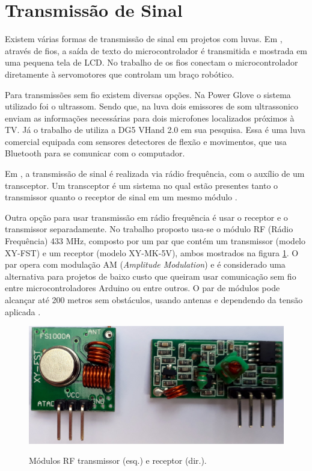 \documentclass[
	12pt,				%
	openright,			%
	oneside,			%
	a4paper,			%
	english,			%
	brazil				%
	]{abntex2}
\begin{document}
		\section{Transmissão de Sinal}
		
		Existem várias formas de transmissão de sinal em projetos com luvas. Em \cite{solanki2013sign}, através de fios, a saída de texto do microcontrolador é transmitida e mostrada em uma pequena tela de LCD. No trabalho de \cite{syed2012armcontroller} os fios conectam o microcontrolador diretamente à servomotores que controlam um braço robótico.

		Para transmissões sem fio existem diversas opções. Na Power Glove \cite{dana1989powerglove} o sistema utilizado foi o ultrassom. Sendo que, na luva dois emissores de som ultrassonico enviam as informações necessárias para dois microfones localizados próximos à TV. Já o trabalho de \cite{kumar2012hci} utiliza a DG5 VHand 2.0 em sua pesquisa. Essa é uma luva comercial equipada com sensores detectores de flexão e movimentos, que usa Bluetooth para se comunicar com o computador.
		
		Em \cite{michela2013rehab}, a transmissão de sinal é realizada via rádio frequência, com o auxílio de um transceptor. Um transceptor é um sistema no qual estão presentes tanto o transmissor quanto o receptor de sinal em um mesmo módulo \cite{scott2017transceiver}.

		Outra opção para usar transmissão em rádio frequência é usar o receptor e o transmissor separadamente. No trabalho proposto usa-se o módulo RF (Rádio Frequência) 433 MHz, composto por um par que contém um transmissor (modelo XY-FST) e um receptor (modelo XY-MK-5V), ambos mostrados na figura \ref{Fig:tx-rx1}. O par opera com modulação AM (\textit{Amplitude Modulation}) e é considerado uma alternativa para projetos de baixo custo que queiram usar comunicação sem fio entre microcontroladores Arduino ou entre outros. O par de módulos pode alcançar até 200 metros sem obstáculos, usando antenas e dependendo da tensão aplicada \cite{institutodigitalrf}.


		\begin{figure}[h!]
			\centering
			\caption{Módulos RF transmissor (esq.) e receptor (dir.).}
  		\includegraphics[width=12cm]{./figures/tx-rx1.jpg}
  		\label{Fig:tx-rx1}
		\end{figure}
\end{document}
